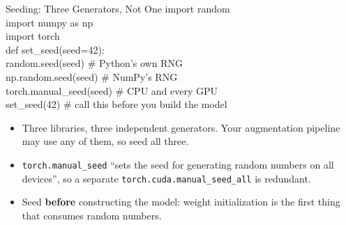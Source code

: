 \begin{frame}{Seeding: Three Generators, Not One}
    \ttfamily\footnotesize{
    import random \\
    import numpy as np \\
    import torch \\

    def set\_seed(seed=42): \\
    \hspace{1em}    random.seed(seed) \# Python's own RNG \\
    \hspace{1em}    np.random.seed(seed) \# NumPy's RNG \\
    \hspace{1em}    torch.manual\_seed(seed) \# CPU and every GPU \\

    set\_seed(42) \# call this before you build the model
    }
\vspace{1em}
\begin{itemize}
    \item Three libraries, three independent generators. Your augmentation pipeline may use any of them, so seed all three.
    \item \texttt{torch.manual\_seed} ``sets the seed for generating random numbers on all devices'', so a separate \texttt{torch.cuda.manual\_seed\_all} is redundant.
    \item Seed \textbf{before} constructing the model: weight initialization is the first thing that consumes random numbers.
\end{itemize}
\end{frame}

